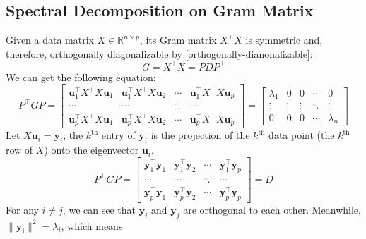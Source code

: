     \subsection{Spectral Decomposition on Gram Matrix}
    Given a data matrix $X\in\mathbb{R}^{n\times p}$, its Gram matrix $X^\top X$ is symmetric and, therefore, orthogonally diagonalizable by \cref{orthogonally-dianonalizable}:
    \begin{equation*}
        G = X^\top X = PDP^{\top}
    \end{equation*}
    We can get the following equation:
    \begin{equation*}
        P^{\top} GP = \begin{bmatrix}
            \mathbf{u}_1^\top X^{\top} X\mathbf{u}_1 & \mathbf{u}_1^\top X^{\top} X\mathbf{u}_2 & \cdots & \mathbf{u}_1^\top X^{\top} X\mathbf{u}_p\\
            \cdots & \cdots & \ddots & \cdots\\
            \mathbf{u}_p^\top X^{\top} X\mathbf{u}_1 & \mathbf{u}_p^\top X^{\top} X\mathbf{u}_2 & \cdots & \mathbf{u}_p^\top X^{\top} X\mathbf{u}_p
        \end{bmatrix} = 
        \begin{bmatrix}
        \lambda_1 & 0 & 0 & \cdots & 0 \\
        \vdots & \vdots & \vdots & \ddots & \vdots \\
        0 & 0 & 0 & \cdots & \lambda_n
        \end{bmatrix}
    \end{equation*}
    Let $X\mathbf{u}_i = \mathbf{y}_i$, the $k^{\text{th}}$ entry of $\mathbf{y}_i$ is the projection of the $k^{\text{th}}$ data point (the $k^{\text{th}}$ row of $X$) onto the eigenvector $\mathbf{u}_i$.
    \begin{equation*}
        P^{\top}GP = \begin{bmatrix}
            \mathbf{y}_1^\top \mathbf{y}_1 & \mathbf{y}_1^\top \mathbf{y}_2 & \cdots & \mathbf{y}_1^\top \mathbf{y}_p\\
            \cdots & \cdots & \ddots & \cdots\\
            \mathbf{y}_p^\top \mathbf{y}_1 & \mathbf{y}_p^\top \mathbf{y}_2& \cdots & \mathbf{y}_p^\top \mathbf{y}_p
        \end{bmatrix} = D
    \end{equation*}
    For any $i \neq j$, we can see that $\mathbf{y}_i$ and $\mathbf{y}_j$ are orthogonal to each other. Meanwhile, $\lVert \mathbf{y_i} \rVert^2 = \lambda_i$, which means
